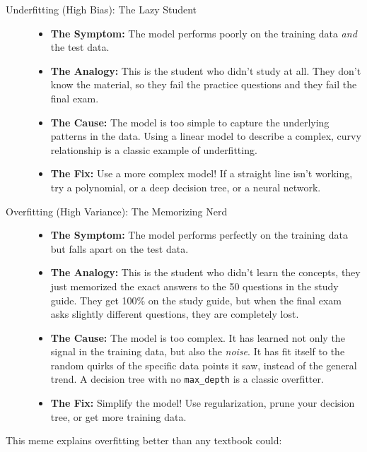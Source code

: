 \documentclass[11pt, letterpaper, openany]{book}
\begin{document}
\begin{description}
    \item[Underfitting (High Bias): The Lazy Student]
    \begin{itemize}
        \item \textbf{The Symptom:} The model performs poorly on the training data \emph{and} the test data.
        \item \textbf{The Analogy:} This is the student who didn't study at all. They don't know the material, so they fail the practice questions and they fail the final exam.
        \item \textbf{The Cause:} The model is too simple to capture the underlying patterns in the data. Using a linear model to describe a complex, curvy relationship is a classic example of underfitting.
        \item \textbf{The Fix:} Use a more complex model! If a straight line isn't working, try a polynomial, or a deep decision tree, or a neural network.
    \end{itemize}
    \item[Overfitting (High Variance): The Memorizing Nerd]
    \begin{itemize}
        \item \textbf{The Symptom:} The model performs perfectly on the training data but falls apart on the test data.
        \item \textbf{The Analogy:} This is the student who didn't learn the concepts, they just memorized the exact answers to the 50 questions in the study guide. They get 100\% on the study guide, but when the final exam asks slightly different questions, they are completely lost.
        \item \textbf{The Cause:} The model is too complex. It has learned not only the signal in the training data, but also the \emph{noise}. It has fit itself to the random quirks of the specific data points it saw, instead of the general trend. A decision tree with no \texttt{max\_depth} is a classic overfitter.
        \item \textbf{The Fix:} Simplify the model! Use regularization, prune your decision tree, or get more training data.
    \end{itemize}
\end{description}

This meme explains overfitting better than any textbook could:
\end{document}
